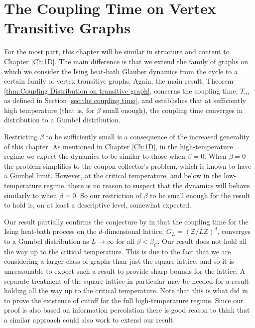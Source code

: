 \chapter{The Coupling Time on Vertex Transitive Graphs}
\label{Ch:GeneralResults}


For the most part, this chapter will be similar in structure and content to Chapter \ref{Ch:1D}. The main difference is that we extend the family of graphs on which we consider the Ising heat-bath Glauber dynamics from the cycle to a certain family of vertex transitive graphs. Again, the main result, Theorem \ref{thm:Coupling Distribution on transitive graph}, concerns the coupling time, $T_n$, as defined in Section \ref{sec:the coupling time}, and establishes that at sufficiently high temperature (that is, for $\beta$ small enough), the coupling time converges in distribution to a Gumbel distribution.

Restricting $\beta$ to be sufficiently small is a consequence of the increased generality of this chapter. As mentioned in Chapter \ref{Ch:1D}, in the high-temperature regime we expect the dynamics to be similar to those when $\beta = 0$. When $\beta = 0$ the problem simplifies to the coupon collector's problem, which is known to have a Gumbel limit. However, at the critical temperature, and below in the low-temperature regime, there is no reason to suspect that the dynamics will behave similarly to when $\beta = 0$. So our restriction of $\beta$ to be small enough for the result to hold is, on at least a descriptive level, somewhat expected. 

Our result partially confirms the conjecture by \citeauthor{Collevecchio2018-nq} in \cite{Collevecchio2018-nq} that the coupling time for the Ising heat-bath process on the $d$-dimensional lattice, $G_L = (\mathbb{Z}/L\mathbb{Z})^d$, converges to a Gumbel distribution as $L \rightarrow\infty$ for all $\beta < \beta_C$. Our result does not hold all the way up to the critical temperature. This is due to the fact that we are considering a larger class of graphs than just the square lattice, and so it is unreasonable to expect such a result to provide sharp bounds for the lattice. A separate treatment of the square lattice in particular may be needed for a result holding all the way up to the critical temperature. Note that this is what \citeauthor{Lubetzky2013-yv} did in \cite{Lubetzky2013-yv} to prove the existence of cutoff for the full high-temperature regime. Since our proof is also based on information percolation there is good reason to think that a similar approach could also work to extend our result.

